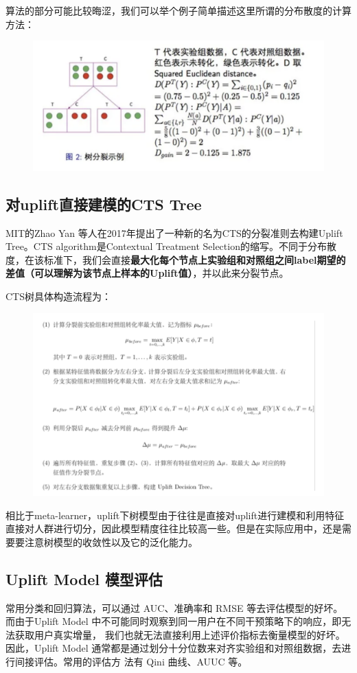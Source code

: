 \documentclass[12pt]{article}
\begin{document}
算法的部分可能比较晦涩，我们可以举个例子简单描述这里所谓的分布散度的计算方法：
\begin{figure}[H]
    \centering
    \includegraphics[width=.6\textwidth]{fig/Causal_Inference_In_DiDi_14.png}
\end{figure}

\subsection{对uplift直接建模的CTS Tree}
MIT的Zhao Yan 等人在2017年提出了一种新的名为CTS的分裂准则去构建Uplift Tree。CTS algorithm是Contextual Treatment Selection的缩写。不同于分布散度，在该标准下，我们会直接\textbf{最大化每个节点上实验组和对照组之间label期望的差值（可以理解为该节点上样本的Uplift值）}，并以此来分裂节点。

CTS树具体构造流程为：
\begin{figure}[H]
    \centering
    \includegraphics[width=1\textwidth]{fig/Causal_Inference_In_DiDi_15.png}
\end{figure}

相比于meta-learner，uplift下树模型由于往往是直接对uplift进行建模和利用特征直接对人群进行切分，因此模型精度往往比较高一些。但是在实际应用中，还是需要要注意树模型的收敛性以及它的泛化能力。

\subsection{Uplift Model 模型评估}
常用分类和回归算法，可以通过 AUC、准确率和 RMSE 等去评估模型的好坏。而由于Uplift Model 中不可能同时观察到同一用户在不同干预策略下的响应，即无法获取用户真实增量， 我们也就无法直接利用上述评价指标去衡量模型的好坏。因此，Uplift Model 通常都是通过划分十分位数来对齐实验组和对照组数据，去进行间接评估。常用的评估方 法有 Qini 曲线、AUUC 等。
\end{document}
